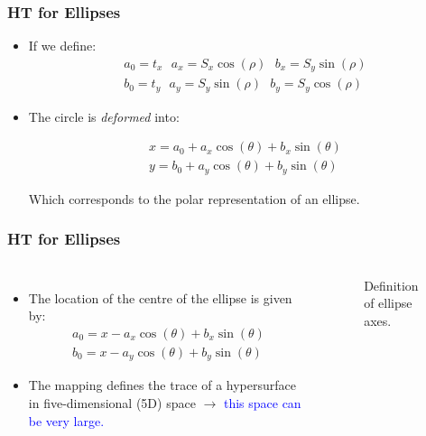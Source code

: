 \documentclass{beamer}
\begin{document}
\begin{frame}
  \frametitle{HT for Ellipses}

  \begin{itemize}
  \item If we define:
    \begin{equation}
      \begin{array}{c}
        a_{0}=t_{x} \ \ \  a_{x}=S_{x}\cos(\rho) \ \ \  b_{x}=S_{y}\sin(\rho)\\
        
        b_{0}=t_{y} \ \ \  a_{y}=S_{y}\sin(\rho)\ \ \  b_{y}=S_{y}\cos(\rho)
      \end{array}
    \end{equation}

  \item The circle is \emph{deformed} into:

    \begin{equation}
      \begin{array}{c}
        x=a_{0}+a_{x}\cos(\theta)+b_{x}\sin(\theta)\\
        
        y=b_{0}+a_{y}\cos(\theta)+b_{y}\sin(\theta)
      \end{array}
      \label{eq:ellipse2}
    \end{equation}

    Which corresponds to the polar representation of an ellipse.
  \end{itemize}
\end{frame}


\begin{frame}
\frametitle{HT for Ellipses}
\begin{columns}

\begin{itemize}
  \item The location of the centre of the ellipse is given by:
\begin{equation}
\begin{array}{c}
   a_{0}=x-a_{x}\cos(\theta)+b_{x}\sin(\theta) \\
   b_{0}=x-a_{y}\cos(\theta)+b_{y}\sin(\theta)
   \end{array}
\end{equation}
  \item The mapping defines the trace of a hypersurface in
    five-dimensional (5D) space $\rightarrow$ \textcolor{blue}{this space can be very
    large.}
  \end{itemize}

\begin{figure}
    \caption{Definition of ellipse axes.}
    \label{fig:ellipse}
  \end{figure}
\end{columns}
\end{frame}
\end{document}
